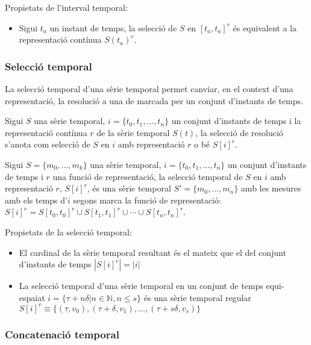 Propietats de l'interval temporal:

\begin{itemize}
\item Sigui $t_a$ un instant de temps, la selecció de
  $S$ en $[t_a,t_a]^r$ és equivalent a la representació contínua
  $S(t_a)^r$.
\end{itemize}




\subsubsection{Selecció temporal}


La selecció  temporal d'una sèrie temporal permet canviar, en el
context d'una representació, la resolució a una de marcada per un
conjunt d'instants de temps. 

Sigui $S$ una sèrie temporal, $i= \{t_0,t_1,\dotsc,t_n\}$ un conjunt
d'instants de temps i la representació contínua $r$ de la sèrie
temporal $S(t)$, la selecció de resolució s'anota com selecció de $S$
en $i$ amb representació $r$ o bé $S[i]^r$.


\begin{definition}
  Sigui $S=\{m_0, \ldots, m_k\}$ una sèrie temporal,
  $i=\{t_0,t_1,\dotsc,t_n\}$ un conjunt d'instants de temps i $r$ una
  funció de representació, la selecció temporal de $S$ en $i$ amb
  representació $r$, $S[i]^r$, és una sèrie temporal $S'=\{m_0, \ldots, m_n\}$
  amb les mesures amb els temps d'$i$ segons marca la funció de
  representació: $S[i]^r= S[t_0,t_0]^r \cup S[t_1,t_1]^r \cup \dotsb
  \cup S[t_n,t_n]^r$.
\end{definition}

Propietats de la selecció temporal:
\begin{itemize}

\item El cardinal de la sèrie temporal resultant és el mateix que el
  del conjunt d'instants de temps $|S[i]^r| = |i|$

\item La selecció temporal d'una sèrie temporal en un conjunt de temps
  equi-espaiat $i = \{\tau+n\delta | n\in\mathbb{N}, n\leq s \}$ és una
  sèrie temporal regular $S[i]^r \equiv \{ (\tau, v_0),
  (\tau+\delta,v_1), \dotsc , (\tau+s\delta,v_s)\}$
\end{itemize}




\subsubsection{Concatenació temporal}

